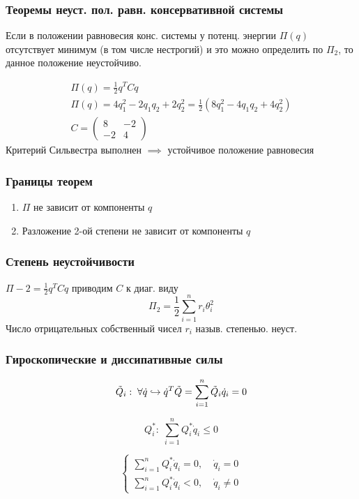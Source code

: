 \documentclass{article}
\begin{document}
\subsubsection{Теоремы неуст. пол. равн. консервативной системы}
\begin{theorem}[Ляпунова I]
  Если в положении равновесия конс. системы у потенц. энергии $\Pi(q)$
  отсутствует минимум (в том числе нестрогий) и это можно определить по
  $\Pi_2$, то данное положение неустойчиво.
\end{theorem}
\begin{eg}
  \begin{gather*}
    \Pi(q)=\frac{1}{2}q^{T}Cq \\ 
    \Pi(q)=4q_1^{2}-2q_1q_2+2q_2^{2}=\frac{1}{2}(8q_{1}^{2}-4q_1q_2+4q_2^{2}) \\ 
    C = \begin{pmatrix}
      8 & -2 \\ 
      -2 & 4
    \end{pmatrix}
  \end{gather*}
  Критерий Сильвестра выполнен $\implies$ устойчивое положение равновесия
\end{eg}

\subsubsection{Границы теорем}
\begin{enumerate}
  \item $\Pi$ не зависит от компоненты $q$
  \item Разложение 2-ой степени не зависит от компоненты $q$
\end{enumerate}
\subsubsection{Степень неустойчивости}
$\Pi-2=\frac{1}{2}q^{T}Cq$ приводим $C$ к диаг. виду
\[
  \Pi_2=\frac{1}{2}\sum_{i=1}^{n}r_i\theta_i^{2}
\]
Число отрицательных собственный чисел $r_i$ назыв. степенью. неуст.
\subsubsection{Гироскопические и диссипативные силы}
\begin{definition}
  \[
    \tilde{Q}_i: \; \forall \dot{q} \hookrightarrow \dot{q}^{T}\tilde{Q}=\sum_{i=1}^{n}\tilde{Q}_i\dot{q}_i=0
  \]
\end{definition}
\begin{definition}
  \[
    Q_i^{*}: \; \sum_{i=1}^{n}Q_i^{*}\dot{q}_i \le 0
  \]
\end{definition}
\begin{definition}
  \[
    \left\{\begin{aligned}
        \sum_{i=1}^{n}Q_{i}^{*}\dot{q}_{i}=0, & \; \dot{q}_i=0 \\ 
        \sum_{i=1}^{n}Q_{i}^{*}\dot{q}_{i}<0, & \; \dot{q}_i\neq0
    \end{aligned}\right.
  \]
\end{definition}
\end{document}
